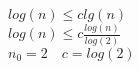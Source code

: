 \documentclass{article}
\begin{document}
	\begin{center}
		$log(n) \leq clg(n)$ \\
		$log(n) \leq c\frac{log(n)}{log(2)}$ \\
		$n_0=2 \quad c=log(2)$
	\end{center}
\end{document}
